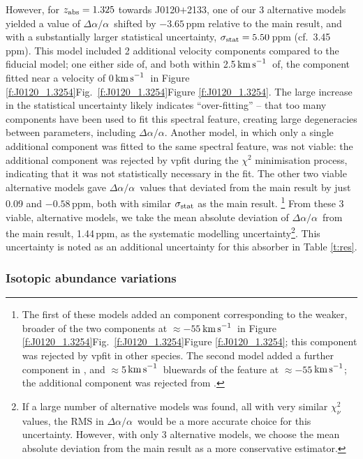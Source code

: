 \documentclass[fleqn,usenatbib,usedcolumn]{mnras}
\newcommand{\Tref}[1]{Table \ref{#1}}
\newcommand{\Fref}[1]{\ifhmode \ifnum\spacefactor=1001 Figure \ref{#1}\else Fig.\ \ref{#1}\fi \else Figure \ref{#1}\fi}
\newcommand{\kms}{\ensuremath{\textrm{km\,s}^{-1}}}
\newcommand{\zab}{\ensuremath{z_\textrm{\scriptsize abs}}}
\newcommand{\daa}{\ensuremath{\Delta\alpha/\alpha}}
\begin{document}
However, for $\zab=1.325$ towards J0120$+$2133, one of our 3 alternative models yielded a value of \daa\ shifted by $-3.65$\,ppm relative to the main result, and with a substantially larger statistical uncertainty, $\sigma_{\rm stat}=5.50$\,ppm (cf.\ 3.45\,ppm). This model included 2 additional velocity components compared to the fiducial model; one either side of, and both within 2.5\,\kms\ of, the component fitted near a velocity of 0\,\kms\ in \Fref{f:J0120_1.3254}. The large increase in the statistical uncertainty likely indicates ``over-fitting'' -- that too many components have been used to fit this spectral feature, creating large degeneracies between parameters, including \daa. Another model, in which only a single additional component was fitted to the same spectral feature, was not viable: the additional component was rejected by {\sc vpfit} during the $\chi^2$ minimisation process, indicating that it was not statistically necessary in the fit. The other two viable alternative models gave \daa\ values that deviated from the main result by just 0.09 and $-0.58$\,ppm, both with similar $\sigma_{\rm stat}$ as the main result. \footnote{The first of these models added an  component corresponding to the weaker, broader of the two  components at $\approx-55$\,\kms\ in \Fref{f:J0120_1.3254}; this component was rejected by {\sc vpfit} in other species. The second model added a further component in ,  and  $\approx$5\,\kms\ bluewards of the feature at $\approx-55$\,\kms; the additional component was rejected from .} From these 3 viable, alternative models, we take the mean absolute deviation of \daa\ from the main result, 1.44\,ppm, as the systematic modelling uncertainty\footnote{If a large number of alternative models was found, all with very similar $\chi^2_\nu$ values, the RMS in \daa\ would be a more accurate choice for this uncertainty. However, with only 3 alternative models, we choose the mean absolute deviation from the main result as a more conservative estimator.}. This uncertainty is noted as an additional uncertainty for this absorber in \Tref{t:res}.


\subsubsection{Isotopic abundance variations}\label{sss:iso}
\end{document}
